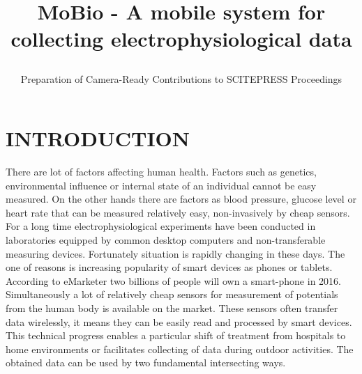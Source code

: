 \documentclass[a4paper,twoside]{article}
\begin{document}
\title{MoBio - A mobile system for collecting electrophysiological data\subtitle{Preparation of Camera-Ready Contributions to SCITEPRESS Proceedings} }

\author{
}   



\onecolumn \maketitle \normalsize \vfill

\section{\uppercase{Introduction}}
\label{sec:introduction}

\noindent 
There are lot of factors affecting human health. Factors such as genetics, environmental influence or internal state of an individual cannot be easy measured. On the other hands there are factors as blood pressure, glucose level or heart rate that can be measured relatively easy, non-invasively by cheap sensors. For a long time electrophysiological experiments have been conducted in laboratories equipped by common desktop computers and non-transferable measuring devices. Fortunately situation is rapidly changing in these days. The one of reasons is increasing popularity of smart devices as phones or tablets. According to eMarketer \cite{emark} two billions of people will own a smart-phone in 2016. Simultaneously a lot of relatively cheap sensors for measurement of potentials from the human body is available on the market. These sensors often transfer data wirelessly, it means they can be easily read and processed by smart devices. This technical progress enables a particular shift of treatment from hospitals to home environments or facilitates collecting of data during outdoor activities. The obtained data can be used by two fundamental intersecting ways. 
\end{document}
